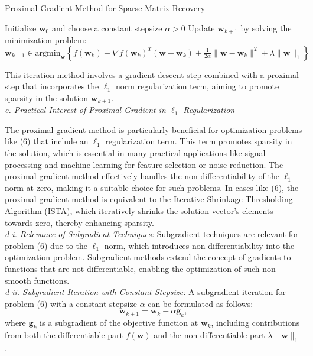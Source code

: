 \documentclass[12pt]{article}
\begin{document}
    \begin{algorithm}
        \caption{Proximal Gradient Method for Sparse Matrix Recovery}
        \begin{algorithmic}[1]
            \State Initialize \(\boldsymbol{w}_0\) and choose a constant stepsize \(\alpha > 0\)
                \State Update \(\boldsymbol{w}_{k+1}\) by solving the minimization problem:
                \State \(\boldsymbol{w}_{k+1} \in \text{argmin}_{\boldsymbol{w}} \left\{ f(\boldsymbol{w}_k) + \nabla f(\boldsymbol{w}_k)^T(\boldsymbol{w} - \boldsymbol{w}_k) + \frac{1}{2\alpha} \|\boldsymbol{w} - \boldsymbol{w}_k\|^2 + \lambda \|\boldsymbol{w}\|_1 \right\}\)
            \EndFor
        \end{algorithmic}
    \end{algorithm}

    This iteration method involves a gradient descent step combined with a proximal step that incorporates the \(\ell_1\) norm regularization term, aiming to promote sparsity in the solution \(\boldsymbol{w}_{k+1}\).\\

    \textit{c. Practical Interest of Proximal Gradient in $\ell_{1}$ Regularization}

    The proximal gradient method is particularly beneficial for optimization problems like (6) that include an $\ell_{1}$ regularization term. This term promotes sparsity in the solution, which is essential in many practical applications like signal processing and machine learning for feature selection or noise reduction. The proximal gradient method effectively handles the non-differentiability of the $\ell_{1}$ norm at zero, making it a suitable choice for such problems. In cases like (6), the proximal gradient method is equivalent to the Iterative Shrinkage-Thresholding Algorithm (ISTA), which iteratively shrinks the solution vector's elements towards zero, thereby enhancing sparsity.\\

    \textit{d-i. Relevance of Subgradient Techniques:}
    Subgradient techniques are relevant for problem (6) due to the $\ell_{1}$ norm, which introduces non-differentiability into the optimization problem. Subgradient methods extend the concept of gradients to functions that are not differentiable, enabling the optimization of such non-smooth functions.\\

    \textit{d-ii. Subgradient Iteration with Constant Stepsize:}
    A subgradient iteration for problem (6) with a constant stepsize \(\alpha\) can be formulated as follows:
    \[
        \boldsymbol{w}_{k+1} = \boldsymbol{w}_k - \alpha \boldsymbol{g}_k,
    \]
    where \(\boldsymbol{g}_k\) is a subgradient of the objective function at \(\boldsymbol{w}_k\), including contributions from both the differentiable part \(f(\boldsymbol{w})\) and the non-differentiable part \(\lambda\|\boldsymbol{w}\|_1\).\\
\end{document}
